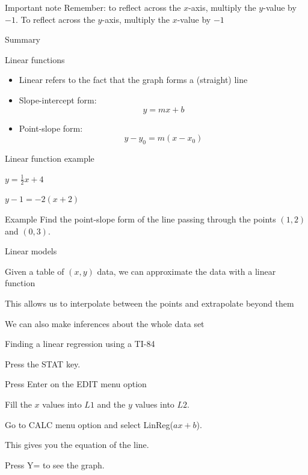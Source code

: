 \documentclass[t]{beamer}
\newenvironment{fpi}
  {\itemize[nolistsep,itemsep=\fill]}
  {\vfill\enditemize}
\begin{document}
\begin{frame}{Important note}
Remember: to reflect across the $x$-axis, multiply the $y$-value by $-1$.
To reflect across the $y$-axis, multiply the $x$-value by $-1$
\end{frame}

\begin{frame}{Summary}
\end{frame}

\begin{frame}{Linear functions}
\begin{itemize}
\item Linear refers to the fact that the graph forms a (straight) line
\vfill
\item Slope-intercept form:
$$y = mx + b$$
\vfill
\item Point-slope form:
$$y - y_0 = m(x - x_0)$$
\vfill
\end{itemize}
\end{frame}

\begin{frame}{Linear function example}
\begin{fpi}
\item $\displaystyle y = \frac{1}{2}x + 4$
\item $\displaystyle y - 1 = -2(x  +2)$
\end{fpi}
\end{frame}


\begin{frame}{Example}
Find the point-slope form of the line passing through the points
$(1,2)$ and $(0,3)$.
\end{frame}

\begin{frame}{Linear models}
\begin{fpi}
\item Given a table of $(x,y)$ data, we can approximate the data
with a linear function
\item This allows us to interpolate between the points and extrapolate beyond them
\item We can also make inferences about the whole data set
\end{fpi}
\end{frame}

\begin{frame}{Finding a linear regression using a TI-84}
\begin{fpi}
\item Press the STAT key.
\item Press Enter on the EDIT menu option
\item Fill the $x$ values into $L1$ and the $y$ values into $L2$.
\item Go to CALC menu option and select LinReg($ax + b$).
\item This gives you the equation of the line.
\item Press Y= to see the graph.
\end{fpi}
\end{frame}
\end{document}
